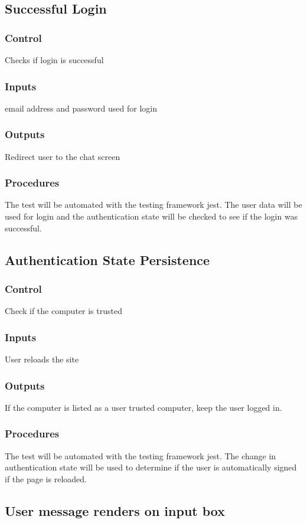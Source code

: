 \documentclass[12pt, titlepage]{article}
\begin{document}
\subsection{Successful Login}
\subsubsection{Control}
Checks if login is successful
\subsubsection{Inputs}
email address and password used for login
\subsubsection{Outputs}
Redirect user to the chat screen
\subsubsection{Procedures}
The test will be automated with the testing framework jest. The user data will be used for login and the authentication state will be checked to see if the login was successful.
\subsection{Authentication State Persistence}
\subsubsection{Control}
Check if the computer is trusted
\subsubsection{Inputs}
User reloads the site
\subsubsection{Outputs}
If the computer is listed as a user trusted computer, keep the user logged in.
\subsubsection{Procedures}
The test will be automated with the testing framework jest. The change in authentication state will be used to determine if the user is automatically signed if the page is reloaded.
\subsection{User message renders on input box}
\end{document}
